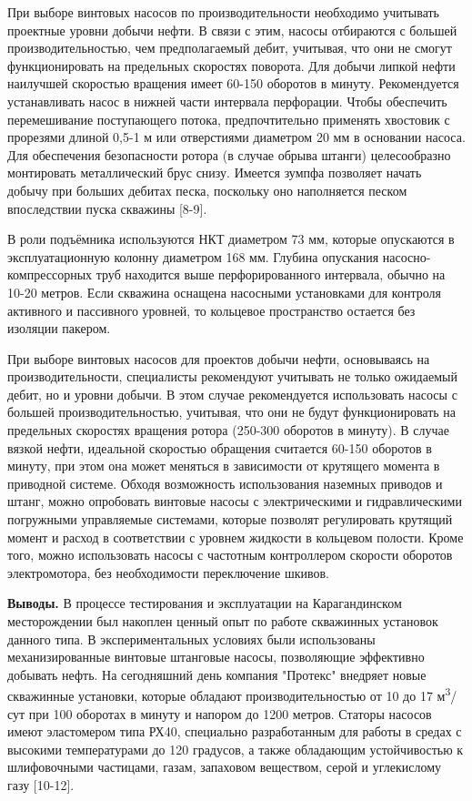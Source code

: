 \begin{multicols}{2}
При выборе винтовых насосов по производительности необходимо учитывать
проектные уровни добычи нефти. В связи с этим, насосы отбираются с
большей производительностью, чем предполагаемый дебит, учитывая, что они
не смогут функционировать на предельных скоростях поворота. Для добычи
липкой нефти наилучшей скоростью вращения имеет 60-150 оборотов в
минуту. Рекомендуется устанавливать насос в нижней части интервала
перфорации. Чтобы обеспечить перемешивание поступающего потока,
предпочтительно применять хвостовик с прорезями длиной 0,5-1 м или
отверстиями диаметром 20 мм в основании насоса. Для обеспечения
безопасности ротора (в случае обрыва штанги) целесообразно монтировать
металлический брус снизу. Имеется зумпфа позволяет начать добычу при
больших дебитах песка, поскольку оно наполняется песком впоследствии
пуска скважины {[}8-9{]}.

В роли подъёмника используются НКТ диаметром 73 мм, которые опускаются в
эксплуатационную колонну диаметром 168 мм. Глубина опускания
насосно-компрессорных труб находится выше перфорированного интервала,
обычно на 10-20 метров. Если скважина оснащена насосными установками для
контроля активного и пассивного уровней, то кольцевое пространство
остается без изоляции пакером.

При выборе винтовых насосов для проектов добычи нефти, основываясь на
производительности, специалисты рекомендуют учитывать не только
ожидаемый дебит, но и уровни добычи. В этом случае рекомендуется
использовать насосы с большей производительностью, учитывая, что они не
будут функционировать на предельных скоростях вращения ротора (250-300
оборотов в минуту). В случае вязкой нефти, идеальной скоростью обращения
считается 60-150 оборотов в минуту, при этом она может меняться в
зависимости от крутящего момента в приводной системе. Обходя возможность
использования наземных приводов и штанг, можно опробовать винтовые
насосы с электрическими и гидравлическими погружными управляемые
системами, которые позволят регулировать крутящий момент и расход в
соответствии с уровнем жидкости в кольцевом полости. Кроме того, можно
использовать насосы с частотным контроллером скорости оборотов
электромотора, без необходимости переключение шкивов.

{\bfseries Выводы.} В процессе тестирования и эксплуатации на
Карагандинском месторождении был накоплен ценный опыт по работе
скважинных установок данного типа. В экспериментальных условиях были
использованы механизированные винтовые штанговые насосы, позволяющие
эффективно добывать нефть. На сегодняшний день компания "Протекс"
внедряет новые скважинные установки, которые обладают
производительностью от 10 до 17 м\textsuperscript{3}/сут при 100
оборотах в минуту и напором до 1200 метров. Статоры насосов имеют
эластомером типа РХ40, специально разработанным для работы в средах с
высокими температурами до 120 градусов, а также обладающим устойчивостью
к шлифовочными частицами, газам, запаховом веществом, серой и
углекислому газу {[}10-12{]}.


\end{multicols}

